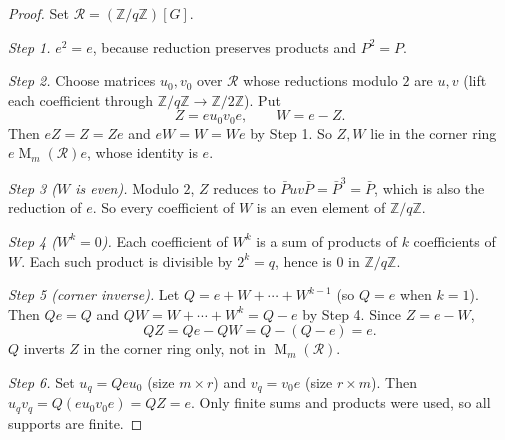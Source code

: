 \documentclass[11pt]{article}
\theoremstyle{remark}
\numberwithin{equation}{section}
\newcommand{\Z}{\mathbb Z}
\newcommand{\Mat}{\operatorname{M}}
\begin{document}
\begin{proof}
Set $\mathcal R=(\Z/q\Z)[G]$.

\emph{Step 1.} $e^2=e$, because reduction preserves products and $P^2=P$.

\emph{Step 2.} Choose matrices $u_0,v_0$ over $\mathcal R$ whose reductions modulo $2$ are $u,v$ (lift each coefficient through $\Z/q\Z\to\Z/2\Z$). Put
\[
 Z=eu_0v_0e,\qquad W=e-Z.
\]
Then $eZ=Z=Ze$ and $eW=W=We$ by Step 1. So $Z,W$ lie in the corner ring $e\Mat_m(\mathcal R)e$, whose identity is $e$.

\emph{Step 3 ($W$ is even).} Modulo $2$, $Z$ reduces to $\bar Puv\bar P=\bar P^3=\bar P$, which is also the reduction of $e$. So every coefficient of $W$ is an even element of $\Z/q\Z$.

\emph{Step 4 ($W^k=0$).} Each coefficient of $W^k$ is a sum of products of $k$ coefficients of $W$. Each such product is divisible by $2^k=q$, hence is $0$ in $\Z/q\Z$.

\emph{Step 5 (corner inverse).} Let $Q=e+W+\cdots+W^{k-1}$ (so $Q=e$ when $k=1$). Then $Qe=Q$ and $QW=W+\cdots+W^k=Q-e$ by Step 4. Since $Z=e-W$,
\[
 QZ=Qe-QW=Q-(Q-e)=e .
\]
$Q$ inverts $Z$ in the corner ring only, not in $\Mat_m(\mathcal R)$.

\emph{Step 6.} Set $u_q=Qeu_0$ (size $m\times r$) and $v_q=v_0e$ (size $r\times m$). Then $u_qv_q=Q(eu_0v_0e)=QZ=e$. Only finite sums and products were used, so all supports are finite.
\end{proof}
\end{document}
